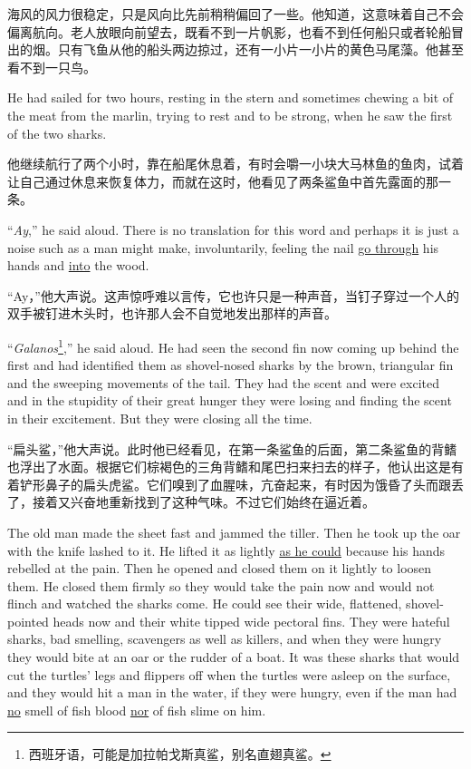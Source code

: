 \begin{paracol}{2}
\switchcolumn

海风的风力很稳定，只是风向比先前稍稍偏回了一些。他知道，这意味着自己不会偏离航向。老人放眼向前望去，既看不到一片帆影，也看不到任何船只或者轮船冒出的烟。只有飞鱼从他的船头两边掠过，还有一小片一小片的黄色马尾藻。他甚至看不到一只鸟。

\switchcolumn*

He had sailed for two hours, resting in the stern and sometimes chewing a
bit of the meat from the marlin, trying to rest and to be strong, when he
saw the first of the two sharks.

\switchcolumn

他继续航行了两个小时，靠在船尾休息着，有时会嚼一小块大马林鱼的鱼肉，试着让自己通过休息来恢复体力，而就在这时，他看见了两条鲨鱼中首先露面的那一条。

\switchcolumn*

``\emph{Ay},'' he said aloud. There is no \gls{translation} for this word and
perhaps it is just a noise such as a man might make, \gls{involuntarily},
feeling the \gls{nail} \uline{go through} his hands and \uline{into} the wood.

\switchcolumn

“Ay，”他大声说。这声惊呼难以言传，它也许只是一种声音，当钉子穿过一个人的双手被钉进木头时，也许那人会不自觉地发出那样的声音。

\switchcolumn*

``\emph{Galanos}\footnote{西班牙语，可能是加拉帕戈斯真鲨，别名直翅真鲨。},'' he
said aloud. He had seen the second fin now coming up behind the first and
had \gls{identified} them as \gls{shovel}-nosed sharks by the brown,
\gls{triangular} fin and the \gls{sweeping} movements of the tail. They had the
scent and were excited and in the \gls{stupidity} of their great hunger they
were losing and finding the scent in their \gls{excitement}. But they were
closing all the time.

\switchcolumn

“扁头鲨，”他大声说。此时他已经看见，在第一条鲨鱼的后面，第二条鲨鱼的背鳍也浮出了水面。根据它们棕褐色的三角背鳍和尾巴扫来扫去的样子，他认出这是有着铲形鼻子的扁头虎鲨。它们嗅到了血腥味，亢奋起来，有时因为饿昏了头而跟丢了，接着又兴奋地重新找到了这种气味。不过它们始终在逼近着。

\switchcolumn*

The old man made the sheet fast and \gls{jammed} the tiller. Then he took up
the oar with the knife lashed to it. He lifted it as lightly \uline{as he could}
because his hands \gls{rebelled} at the pain. Then he opened and closed them
on it lightly to loosen them. He closed them firmly so they would take the
pain now and would not \gls{flinch} and watched the sharks come. He could
see their wide, flattened, shovel-pointed heads now and their white
tipped wide pectoral fins. They were \gls{hateful} sharks, bad
smelling, scavengers as well as killers, and when they were hungry they
would bite at an oar or the \gls{rudder} of a boat. It was these sharks that would
cut the turtles' legs and \glspl{flipper} off when the turtles were asleep
on the surface, and they would hit a man in the water, if they were hungry,
even if the man had \uline{no} smell of fish blood \uline{nor} of fish \gls{slime} on him.


\end{paracol}
